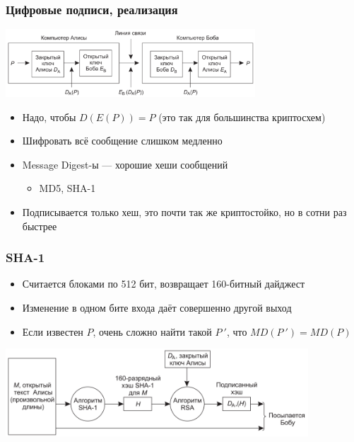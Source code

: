 \documentclass{../../slides-style}
\begin{document}
    \begin{frame}
        \frametitle{Цифровые подписи, реализация}
        \begin{center}
            \includegraphics[width=0.7\textwidth]{signature.png}
        \end{center}
        \begin{itemize}
            \item Надо, чтобы $D(E(P)) = P$ (это так для большинства криптосхем)
            \item Шифровать всё сообщение слишком медленно
            \item Message Digest-ы --- хорошие хеши сообщений
            \begin{itemize}
                \item MD5, SHA-1
            \end{itemize}
            \item Подписывается только хеш, это почти так же криптостойко, но в сотни раз быстрее
        \end{itemize}
    \end{frame}

    \begin{frame}
        \frametitle{SHA-1}
        \begin{itemize}
            \item Считается блоками по 512 бит, возвращает 160-битный дайджест
            \item Изменение в одном бите входа даёт совершенно другой выход
            \item Если известен $P$, очень сложно найти такой $P\ '$, что $MD(P\ ') = MD(P)$
        \end{itemize}
        \begin{center}
            \includegraphics[width=0.85\textwidth]{sha1Signature.png}
        \end{center}
    \end{frame}
\end{document}
